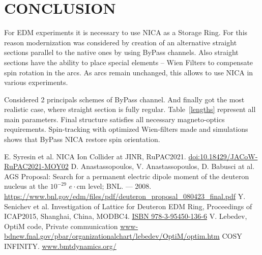 \documentclass[a4paper,
               keeplastbox,   %
               ]{jacow}
\begin{document}
\section{CONCLUSION}

\par For EDM experiments it is necessary to use NICA as a Storage Ring. 
For this reason modernization was considered by creation of an alternative straight sections parallel to the native ones by using ByPass channels.
Also straight sections have the ability to place special elements – Wien Filters to compensate spin rotation in the arcs.
As arcs remain unchanged, this allows to use NICA in various experiments.
\par Considered 2 principals schemes of ByPass channel.
And finally got the most realistic case, where straight section is fully regular. 
Table~\ref{lengths} represent all main parameters.
Final structure satisfies all necessary magneto-optics requirements. Spin-tracking with optimized Wien-filters made and simulations shows that ByPass NICA restore spin orientation.

	{\printbibliography}
	{
	\begin{thebibliography}{9}
	
	E. Syresin et al. NICA Ion Collider at JINR, RuPAC2021.
	\url{doi:10.18429/JACoW-RuPAC2021-MOY02}
	D. Anastassopoulos, V. Anastassopoulos, D. Babusci at al. AGS Proposal: Search for a permanent electric dipole moment of the deuteron nucleus at the $10^{-29}$ $e \cdot$cm level; BNL. — 2008.
	\url{https://www.bnl.gov/edm/files/pdf/deuteron_proposal_080423_final.pdf}
	Y. Senichev et al. Investigation of Lattice for Deuteron EDM Ring, Proceedings of ICAP2015, Shanghai, China, MODBC4.
	\url{ISBN 978-3-95450-136-6}
	V. Lebedev, OptiM code, Private communication
	\url{www-bdnew.fnal.gov/pbar/organizationalchart/lebedev/OptiM/optim.htm}
	COSY INFINITY.
	\url{www.bmtdynamics.org/}
	
	\end{thebibliography}
}
\end{document}

